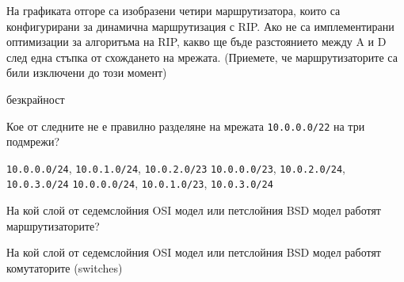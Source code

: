 \begin{questions}
  \begin{center}
  \end{center}

  \question[7] На графиката отгоре са изобразени четири маршрутизатора, които са
  конфигурирани за динамична маршрутизация с RIP. Ако не са имплементирани
  оптимизации за алгоритъма на RIP, какво ще бъде разстоянието между A и
  D след една стъпка от схождането на мрежата. (Приемете, че маршрутизаторите са
  били изключени до този момент)

  \begin{oneparchoices}
    \CorrectChoice безкрайност
  \end{oneparchoices}

  \question[2] Кое от следните не е правилно разделяне на мрежата
  \texttt{10.0.0.0/22} на три подмрежи?

  \begin{choices}
    \choice \texttt{10.0.0.0/24}, \texttt{10.0.1.0/24}, \texttt{10.0.2.0/23}
    \CorrectChoice \texttt{10.0.0.0/23}, \texttt{10.0.2.0/24}, \texttt{10.0.3.0/24}
    \choice \texttt{10.0.0.0/24}, \texttt{10.0.1.0/23}, \texttt{10.0.3.0/24}
  \end{choices}

  \question[6] На кой слой от седемслойния OSI модел или петслойния BSD модел
  работят маршрутизаторите?
  \begin{oneparchoices}
  \end{oneparchoices}

  \question[6] На кой слой от седемслойния OSI модел или петслойния BSD модел
  работят комутаторите (\foreignlanguage{english}{switches})
  \begin{oneparchoices}
  \end{oneparchoices}


\end{questions}
